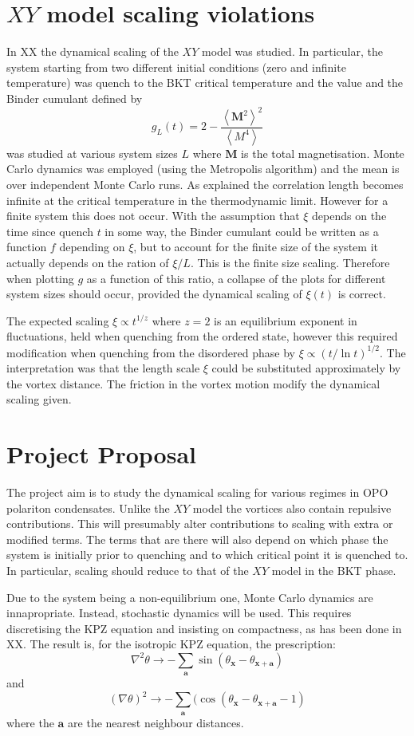 \documentclass[letterpaper, 10 pt, conference]{IEEEtran}  %
\newcommand{\mean}[1]{\left < #1 \right >}
\newcommand{\myvec}[1]{\boldsymbol{#1}}
\begin{document}
\section{$XY$ model scaling violations}

In XX the dynamical scaling of the $XY$ model was studied. 
In particular, the system starting from two different initial conditions (zero and infinite temperature) was quench to the BKT critical temperature and the value and the Binder cumulant defined by 
\[
g_L(t) = 2 - \frac{\mean{\myvec{M}^2}^2}{\mean{M^4}}
\]
was studied at various system sizes $L$ where $\myvec{M}$ is the total magnetisation. 
Monte Carlo dynamics was employed (using the Metropolis algorithm) and the mean is over independent Monte Carlo runs. 
As explained the correlation length becomes infinite at the critical temperature in the thermodynamic limit. 
However for a finite system this does not occur. 
With the assumption that $\xi$ depends on the time since quench $t$ in some way, the Binder cumulant could be written as a function $f$ depending on $\xi$, but to account for the finite size of the system it actually depends on the ration of $\xi/L$.
This is the finite size scaling. 
Therefore when plotting $g$ as a function of this ratio, a collapse of the plots for different system sizes should occur, provided the dynamical scaling of $\xi(t)$ is correct. 

The expected scaling $\xi \propto t^{1/z}$ where $z=2$ is an equilibrium exponent in fluctuations, held when quenching from the ordered state, however this required modification when quenching from the disordered phase by $\xi \propto (t/\ln t)^{1/2}$. 
The interpretation was that the length scale $\xi$ could be substituted approximately by the vortex distance. 
The friction in the vortex motion modify the dynamical scaling given.  

\section{Project Proposal}

The project aim is to study the dynamical scaling for various regimes in OPO polariton condensates. 
Unlike the $XY$ model the vortices also contain repulsive contributions. 
This will presumably alter contributions to scaling with extra or modified terms. 
The terms that are there will also depend on which phase the system is initially prior to quenching and to which critical point it is quenched to. 
In particular, scaling should reduce to that of the $XY$ model in the BKT phase.

Due to the system being a non-equilibrium one, Monte Carlo dynamics are innapropriate.
Instead, stochastic dynamics will be used. 
This requires discretising the KPZ equation and insisting on compactness, as has been done in XX. The result is, for the isotropic KPZ equation, the prescription: 
\[
	\nabla^2 \theta \to - \sum_{\myvec{a}} \sin ( \theta_{\myvec{x}} - \theta_{\myvec{x} + \myvec{a}})
\]
and
\[
(\nabla \theta )^2 \to - \sum_{\myvec{a}} ( \cos ( \theta_{\myvec{x}} - \theta_{\myvec{x} + \myvec{a}} - 1 )
\]
where the $\myvec{a}$ are the nearest neighbour distances.
\printbibliography
\end{document}
